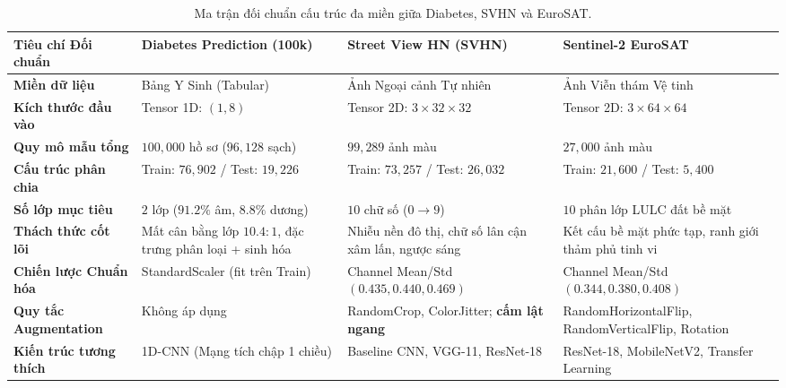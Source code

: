 \documentclass[12pt,a4paper]{report}
\begin{document}
\begin{table}[H]
\centering
\caption{Ma trận đối chuẩn cấu trúc đa miền giữa Diabetes, SVHN và EuroSAT.}
\label{tab:multi_domain_benchmark}
\small
\begin{tabularx}{\textwidth}{lXXX}
\toprule
\textbf{Tiêu chí Đối chuẩn} & \textbf{Diabetes Prediction (100k)} & \textbf{Street View HN (SVHN)} & \textbf{Sentinel-2 EuroSAT} \\
\midrule
\textbf{Miền dữ liệu} & Bảng Y Sinh (Tabular) & Ảnh Ngoại cảnh Tự nhiên & Ảnh Viễn thám Vệ tinh \\
\textbf{Kích thước đầu vào} & Tensor 1D: $(1, 8)$ & Tensor 2D: $3 \times 32 \times 32$ & Tensor 2D: $3 \times 64 \times 64$ \\
\textbf{Quy mô mẫu tổng} & $100,000$ hồ sơ ($96,128$ sạch) & $99,289$ ảnh màu & $27,000$ ảnh màu \\
\textbf{Cấu trúc phân chia} & Train: $76,902$ / Test: $19,226$ & Train: $73,257$ / Test: $26,032$ & Train: $21,600$ / Test: $5,400$ \\
\textbf{Số lớp mục tiêu} & $2$ lớp ($91.2\%$ âm, $8.8\%$ dương) & $10$ chữ số ($0 \to 9$) & $10$ phân lớp LULC đất bề mặt \\
\textbf{Thách thức cốt lõi} & Mất cân bằng lớp $10.4:1$, đặc trưng phân loại + sinh hóa & Nhiễu nền đô thị, chữ số lân cận xâm lấn, ngược sáng & Kết cấu bề mặt phức tạp, ranh giới thảm phủ tinh vi \\
\textbf{Chiến lược Chuẩn hóa} & StandardScaler (fit trên Train) & Channel Mean/Std $(0.435, 0.440, 0.469)$ & Channel Mean/Std $(0.344, 0.380, 0.408)$ \\
\textbf{Quy tắc Augmentation} & Không áp dụng & RandomCrop, ColorJitter; \textbf{cấm lật ngang} & RandomHorizontalFlip, RandomVerticalFlip, Rotation \\
\textbf{Kiến trúc tương thích} & 1D-CNN (Mạng tích chập 1 chiều) & Baseline CNN, VGG-11, ResNet-18 & ResNet-18, MobileNetV2, Transfer Learning \\
\bottomrule
\end{tabularx}
\end{table}
\end{document}
